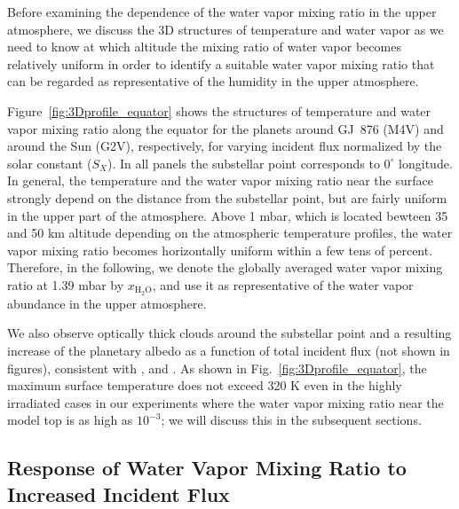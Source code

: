 \documentclass[11pt,numberedappendix,twocolappendix,]{emulateapj}
\def\water{H$_2$O}
\def\xwater{$x_\text{\water}$}
\def\preslevel{1.39 mbar}
\def\wv{water vapor}
\newcommand{\yf}[1]{{\color{orange}#1}}
\begin{document}
Before examining the dependence of the \wv{} mixing ratio in the upper atmosphere, we discuss the 3D \yf{structures} of temperature and water vapor as we need to know at which altitude the mixing ratio of \wv{} becomes relatively uniform in order to identify a suitable \wv{} mixing ratio that can be regarded as representative of the humidity in the upper atmosphere. 

Figure~\ref{fig:3Dprofile_equator} shows the \yf{structures} of temperature and  \wv{} mixing ratio along the equator for the planets around GJ~876 (M4V) and around the Sun (G2V), respectively, for varying incident flux normalized by the solar constant ($S_X$). 
In all panels the substellar point corresponds to $0^{\circ }$ longitude. 
In general, the temperature and the \wv{} mixing ratio near the surface strongly depend on the distance from the substellar point, but are fairly uniform in the upper part of the atmosphere. 
Above 1 mbar, which is located bewteen 35 and 50 km altitude depending on the atmospheric temperature profiles, the \wv{} mixing ratio becomes horizontally uniform within a few tens of percent. 
Therefore, in the following, we denote the globally averaged \wv{} mixing ratio at \preslevel{} by \xwater{}, and use it as representative of the \wv{} abundance in the upper atmosphere. 

We also observe optically thick clouds around the substellar point and a resulting increase of the planetary albedo as a function of total incident flux (not shown in figures), consistent with \citet{Yang2013,Yang2014}, \citet{Kopparapu2016} and \citet{Way2016}. 
As shown in Fig.~\ref{fig:3Dprofile_equator}, the maximum surface temperature does not exceed 320 K even in the highly irradiated cases in our experiments where the \wv{} mixing ratio near the model top is as high as $10^{-3}$; we will discuss this in the subsequent sections. 


\subsection{Response of Water Vapor Mixing Ratio to Increased Incident Flux}
\label{ss:result_H2Omixingratio}
\end{document}
